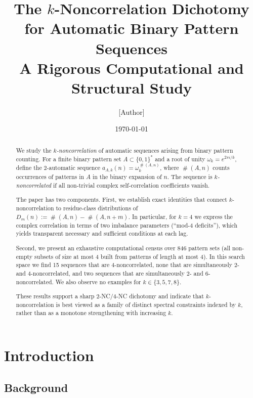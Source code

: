 \documentclass[11pt]{article}
\title{\textbf{The $k$-Noncorrelation Dichotomy\\
for Automatic Binary Pattern Sequences}\\[6pt]
\large A Rigorous Computational and Structural Study}
\author{[Author]}
\date{\today}
\theoremstyle{definition}
\theoremstyle{remark}
\DeclareMathOperator{\occ}{\#}
\begin{document}
\maketitle

\begin{abstract}
We study the \emph{$k$-noncorrelation} of automatic sequences arising
from binary pattern counting.  For a finite binary pattern set
$A \subset \{0,1\}^*$ and a root of unity $\omega_k = e^{2\pi i/k}$,
define the 2-automatic sequence $a_{A,k}(n) = \omega_k^{\occ(A,n)}$,
where $\occ(A,n)$ counts occurrences of patterns in $A$ in the binary
expansion of $n$.  The sequence is \emph{$k$-noncorrelated} if all
non-trivial complex self-correlation coefficients vanish.

The paper has two components.  First, we establish exact identities
that connect $k$-noncorrelation to residue-class distributions of
$D_m(n):=\occ(A,n)-\occ(A,n+m)$.  In particular, for $k=4$ we express
the complex correlation in terms of two imbalance parameters
(``mod-$4$ deficits''), which yields transparent necessary and
sufficient conditions at each lag.

Second, we present an exhaustive computational census over 846 pattern
sets (all non-empty subsets of size at most 4 built from patterns of
length at most 4).  In this search space we find 15 sequences that are
$4$-noncorrelated, none that are simultaneously $2$- and $4$-noncorrelated,
and two sequences that are simultaneously $2$- and $6$-noncorrelated.
We also observe no examples for $k\in\{3,5,7,8\}$.

These results support a sharp $2$-NC/$4$-NC dichotomy and indicate that
$k$-noncorrelation is best viewed as a family of distinct spectral
constraints indexed by $k$, rather than as a monotone strengthening
with increasing $k$.
\end{abstract}

\tableofcontents
\bigskip

\section{Introduction}
\label{sec:intro}

\subsection{Background}
\end{document}
